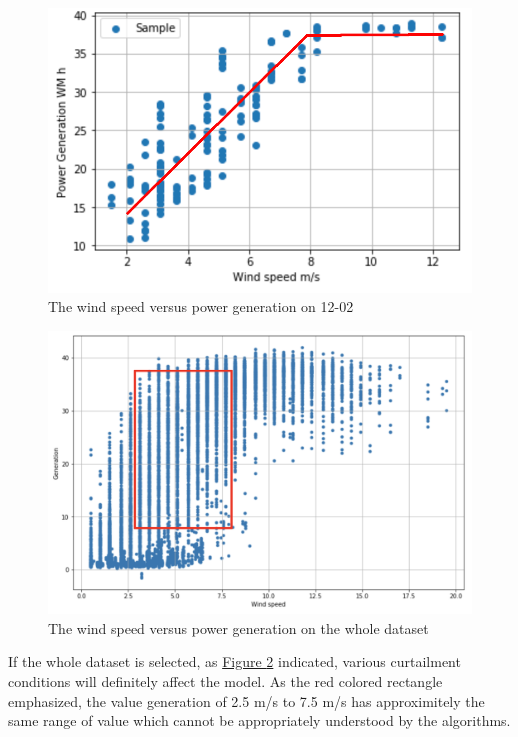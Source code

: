 \documentclass[12pt,a4paper]{report}
\begin{document}
                    \begin{figure}[ht]
                        \centerline{\includegraphics[scale=1.4]{powervsgenerationsample}}
                        \caption{The wind speed versus power generation on 12-02}
                        \label{plot_speed_vs_power_1202}
                    \end{figure}

                    \begin{figure}[ht]
                        \centerline{\includegraphics[scale=0.2]{generationvsspeedwholeset}}
                        \caption{The wind speed versus power generation on the whole dataset}
                        \label{plot_speed_vs_power_whole}
                    \end{figure}
                
                    If the whole dataset is selected, as \hyperref[plot_speed_vs_power_whole]{Figure \ref*{plot_speed_vs_power_whole}} indicated, various curtailment conditions will definitely affect the model. As the red colored rectangle emphasized, the value generation of 2.5 m/s to 7.5 m/s has approximitely the same range of value which cannot be appropriately understood by the algorithms.
\end{document}
